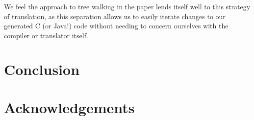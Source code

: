 \documentclass[times]{speauth}
\begin{document}
We feel the approach to tree walking in the paper lends itself well to this strategy of translation, as this separation allows us to easily iterate changes to our generated C (or Java!) code without needing to concern ourselves with the compiler or translator itself.


\section{Conclusion}


\section{Acknowledgements}




\newpage
\end{document}
